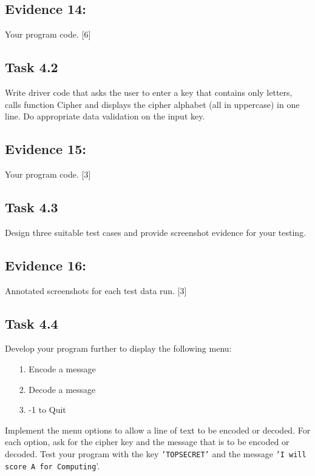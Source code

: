 \subsection*{Evidence 14:}

Your program code. \hfill{} {[}6{]}

\subsection*{Task 4.2 }

Write driver code that asks the user to enter a key that contains
only letters, calls function Cipher and displays the cipher alphabet
(all in uppercase) in one line. Do appropriate data validation on
the input key. 

\subsection*{Evidence 15: }

Your program code. \hfill{} {[}3{]}

\subsection*{Task 4.3 }

Design three suitable test cases and provide screenshot evidence for
your testing. 

\subsection*{Evidence 16: }

Annotated screenshots for each test data run. \hfill{} {[}3{]}

\subsection*{Task 4.4 }

Develop your program further to display the following menu: 
\begin{enumerate}
\item[1.]  Encode a message
\item[2.]  Decode a message 
\item[3.]  -1 to Quit
\end{enumerate}
Implement the menu options to allow a line of text to be encoded or
decoded. For each option, ask for the cipher key and the message that
is to be encoded or decoded. Test your program with the key \texttt{'TOPSECRET'}
and the message \texttt{'I will score A for Computing}'. 

